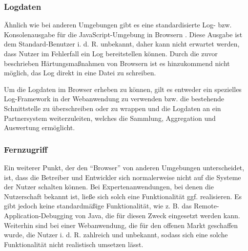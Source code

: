 \subsubsection{Logdaten}
\label{sec:logdaten}

Ähnlich wie bei anderen Umgebungen gibt es eine standardisierte Log- bzw. Konsolenausgabe für die JavaScript-Umgebung in Browsern \cite{MDNConsole}. Diese Ausgabe ist dem Standard-Benutzer i. d. R. unbekannt, daher kann nicht erwartet werden, dass Nutzer im Fehlerfall ein Log bereitstellen können. Durch die zuvor beschrieben Härtungsmaßnahmen von Browsern ist es hinzukommend nicht möglich, das Log direkt in eine Datei zu schreiben.

Um die Logdaten im Browser erheben zu können, gilt es entweder ein spezielles Log-Framework in der Webanwendung zu verwenden bzw. die bestehende Schnittstelle zu überschreiben oder zu wrappen und die Logdaten an ein Partnersystem weiterzuleiten, welches die Sammlung, Aggregation und Auswertung ermöglicht.

\subsubsection{Fernzugriff}

Ein weiterer Punkt, der den \enquote{Browser} von anderen Umgebungen unterscheidet, ist, dass die Betreiber und Entwickler sich normalerweise nicht auf die Systeme der Nutzer schalten können. Bei Expertenanwendungen, bei denen die Nutzerschaft bekannt ist, ließe sich solch eine Funktionalität ggf. realisieren. Es gibt jedoch keine standardmäßige Funktionalität, wie z. B. das Remote-Application-Debugging \cite{JavaDebugWireProtocol} von Java, die für diesen Zweck eingesetzt werden kann. Weiterhin sind bei einer Webanwendung, die für den offenen Markt geschaffen wurde, die Nutzer i. d. R. zahlreich und unbekannt, sodass sich eine solche Funktionalität nicht realistisch umsetzen lässt.